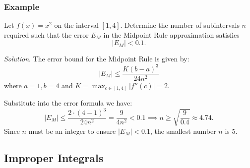 \subsubsection{Example}
\begin{ex}
    Let $f(x) = x^2$ on the interval $[1,4]$. Determine the number of subintervals $n$ required such that the error $E_M$ in the Midpoint Rule approximation satisfies 
    \[|E_M| < 0.1.\] 
    
    \textit{Solution}. The error bound for the Midpoint Rule is given by:
    \[|E_M| \leq \dfrac{K(b-a)^3}{24n^2} \]
    where $a=1, b=4$ and $K = \max_{c \in [1, 4]} |f''(c)| = 2$.
    
    Substitute into the error formula we have:
    \[|E_M| \leq \dfrac{2 \cdot (4-1)^3}{24n^2} = \dfrac{9}{4n^2} < 0.1 \implies n \geq \sqrt{\dfrac{9}{0.4}} \approx 4.74.\]
    Since $n$ must be an integer to ensure $|E_M| < 0.1$, the smallest number $n$ is 5.
\end{ex}

\newpage

\subsection{Improper Integrals} 


